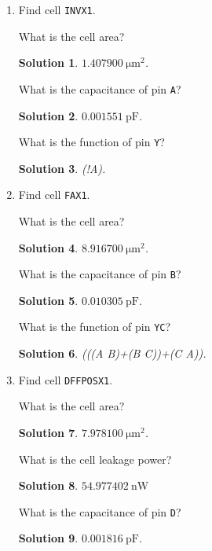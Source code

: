\documentclass[acmlarge,screen=true,anonymous=false,11pt]{acmart}
\newtheorem*{solution*}{Solution}
\begin{document}
\begin{enumerate}
    \item Find cell \texttt{INVX1}.
    \begin{example}
        What is the cell area?
    \end{example}
    \begin{solution*}
        $1.407900~\mathrm{\mu m^2}$.
    \end{solution*}
    \begin{example}
        What is the capacitance of pin \texttt{A}?
    \end{example}
    \begin{solution*}
        $0.001551~\mathrm{pF}$.
    \end{solution*}
    \begin{example}
        What is the function of pin \texttt{Y}?
    \end{example}
    \begin{solution*}
        (!A).
    \end{solution*}
    \item Find cell \texttt{FAX1}.
    \begin{example}
        What is the cell area?
    \end{example}
    \begin{solution*}
        $8.916700~\mathrm{\mu m^2}$.
    \end{solution*}
    \begin{example}
        What is the capacitance of pin \texttt{B}?
    \end{example}
    \begin{solution*}
        $0.010305~\mathrm{pF}$.
    \end{solution*}
    \begin{example}
        What is the function of pin \texttt{YC}?
    \end{example}
    \begin{solution*}
        (((A B)+(B C))+(C A)).
    \end{solution*}
    \item Find cell \texttt{DFFPOSX1}.
    \begin{example}
        What is the cell area?
    \end{example}
    \begin{solution*}
        $7.978100~\mathrm{\mu m^2}$.
    \end{solution*}
    \begin{example}
        What is the cell leakage power?
    \end{example}
    \begin{solution*}
        $54.977402~\mathrm{nW}$
    \end{solution*}
    \begin{example}
        What is the capacitance of pin \texttt{D}?
    \end{example}
    \begin{solution*}
        $0.001816~\mathrm{pF}$.
    \end{solution*}
\end{enumerate}
\end{document}
